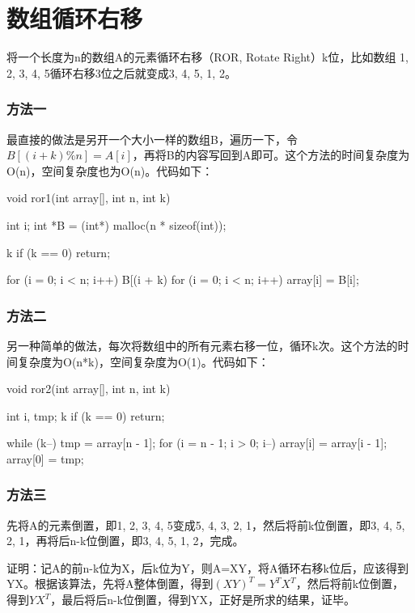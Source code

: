 \section{数组循环右移} %
将一个长度为n的数组A的元素循环右移（ROR, Rotate Right）k位，比如数组 {1, 2, 3, 4, 5}循环右移3位之后就变成{3, 4, 5, 1, 2}。

\subsubsection{方法一}
最直接的做法是另开一个大小一样的数组B，遍历一下，令$B[(i + k) \% n] = A[i]$，再将B的内容写回到A即可。这个方法的时间复杂度为O(n)，空间复杂度也为O(n)。代码如下：

\begin{Codex}[label=ror.c]
void ror1(int array[], int n, int k) {
    int i;
    int *B = (int*) malloc(n * sizeof(int));

    k %
    if (k == 0)
        return;

    for (i = 0; i < n; i++) {
        B[(i + k) %
    }
    for (i = 0; i < n; i++) {
        array[i] = B[i];
    }
}
\end{Codex}

\subsubsection{方法二}
另一种简单的做法，每次将数组中的所有元素右移一位，循环k次。这个方法的时间复杂度为O(n*k)，空间复杂度为O(1)。代码如下：

\begin{Codex}[label=ror.c]
void ror2(int array[], int n, int k) {
    int i, tmp;
    k %
    if (k == 0)
        return;

    while (k--) {
        tmp = array[n - 1];
        for (i = n - 1; i > 0; i--) {
            array[i] = array[i - 1];
        }
        array[0] = tmp;
    }
}
\end{Codex}

\subsubsection{方法三}
先将A的元素倒置，即{1, 2, 3, 4, 5}变成{5, 4, 3, 2, 1}，然后将前k位倒置，即{3, 4, 5, 2, 1}，再将后n-k位倒置，即{3, 4, 5, 1, 2}，完成。

证明：记A的前n-k位为X，后k位为Y，则A=XY，将A循环右移k位后，应该得到YX。根据该算法，先将A整体倒置，得到$(XY)^T=Y^TX^T$，然后将前k位倒置，得到$YX^T$，最后将后n-k位倒置，得到YX，正好是所求的结果，证毕。

